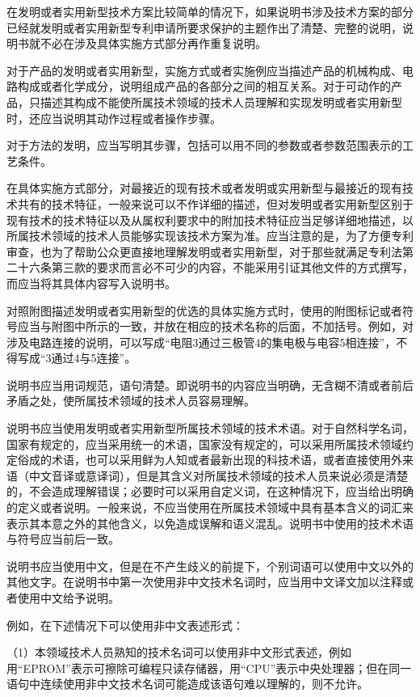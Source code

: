 在发明或者实用新型技术方案比较简单的情况下，如果说明书涉及技术方案的部分已经就发明或者实用新型专利申请所要求保护的主题作出了清楚、完整的说明，说明书就不必在涉及具体实施方式部分再作重复说明。

对于产品的发明或者实用新型，实施方式或者实施例应当描述产品的机械构成、电路构成或者化学成分，说明组成产品的各部分之间的相互关系。对于可动作的产品，只描述其构成不能使所属技术领域的技术人员理解和实现发明或者实用新型时，还应当说明其动作过程或者操作步骤。

对于方法的发明，应当写明其步骤，包括可以用不同的参数或者参数范围表示的工艺条件。

在具体实施方式部分，对最接近的现有技术或者发明或实用新型与最接近的现有技术共有的技术特征，一般来说可以不作详细的描述，但对发明或者实用新型区别于现有技术的技术特征以及从属权利要求中的附加技术特征应当足够详细地描述，以所属技术领域的技术人员能够实现该技术方案为准。应当注意的是，为了方便专利审查，也为了帮助公众更直接地理解发明或者实用新型，对于那些就满足专利法第二十六条第三款的要求而言必不可少的内容，不能采用引证其他文件的方式撰写，而应当将其具体内容写入说明书。

对照附图描述发明或者实用新型的优选的具体实施方式时，使用的附图标记或者符号应当与附图中所示的一致，并放在相应的技术名称的后面，不加括号。例如，对涉及电路连接的说明，可以写成“电阻3通过三极管4的集电极与电容5相连接”，不得写成“3通过4与5连接”。

说明书应当用词规范，语句清楚。即说明书的内容应当明确，无含糊不清或者前后矛盾之处，使所属技术领域的技术人员容易理解。

说明书应当使用发明或者实用新型所属技术领域的技术术语。对于自然科学名词，国家有规定的，应当采用统一的术语，国家没有规定的，可以采用所属技术领域约定俗成的术语，也可以采用鲜为人知或者最新出现的科技术语，或者直接使用外来语（中文音译或意译词），但是其含义对所属技术领域的技术人员来说必须是清楚的，不会造成理解错误；必要时可以采用自定义词，在这种情况下，应当给出明确的定义或者说明。一般来说，不应当使用在所属技术领域中具有基本含义的词汇来表示其本意之外的其他含义，以免造成误解和语义混乱。说明书中使用的技术术语与符号应当前后一致。

说明书应当使用中文，但是在不产生歧义的前提下，个别词语可以使用中文以外的其他文字。在说明书中第一次使用非中文技术名词时，应当用中文译文加以注释或者使用中文给予说明。

例如，在下述情况下可以使用非中文表述形式：

{\setlength{\parindent}{17.1bp}（1）本领域技术人员熟知的技术名词可以使用非中文形式表述，例如用“EPROM”表示可擦除可编程只读存储器，用“CPU”表示中央处理器；但在同一语句中连续使用非中文技术名词可能造成该语句难以理解的，则不允许。\par}

